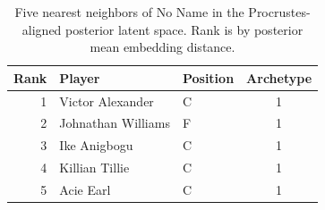 \begin{table}[htbp]
  \centering\small
  \begin{tabular}{rllc}
    \toprule
    Rank & Player & Position & Archetype \\
    \midrule
    1 & Victor Alexander & C & 1 \\
    2 & Johnathan Williams & F & 1 \\
    3 & Ike Anigbogu & C & 1 \\
    4 & Killian Tillie & C & 1 \\
    5 & Acie Earl & C & 1 \\
    \bottomrule
  \end{tabular}
  \caption{Five nearest neighbors of No Name in the Procrustes-aligned posterior latent space. Rank is by posterior mean embedding distance.}
  \label{tab:No_Name_neighbors}
\end{table}

